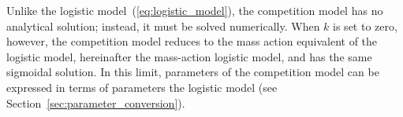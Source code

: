 
Unlike the logistic model~(\ref{eq:logistic_model}), the competition
model has no analytical solution; instead, it must be solved
numerically. When \(k\) is set to zero, however, the competition model
reduces to the mass action equivalent of the logistic model,
hereinafter the mass-action logistic model, and has the same sigmoidal
solution. In this limit, parameters of the competition model can be
expressed in terms of parameters the logistic model (see
Section~\ref{sec:parameter_conversion}).

